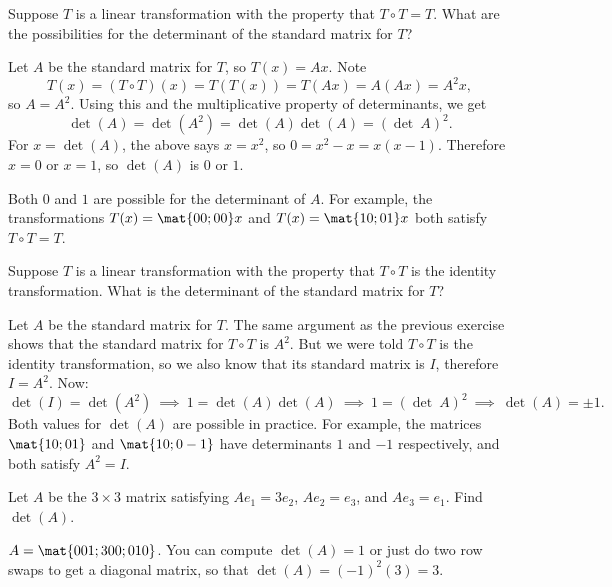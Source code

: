 \begin{problems}
\problem %
Suppose $T$ is a linear transformation with the property that $T \circ T = T$.
What are the possibilities for the determinant of the standard matrix for $T$?

\begin{solution}
Let $A$ be the standard matrix for $T$, so $T(x) = Ax$.  Note
\[T(x) = (T \circ T)(x) = T(T(x)) = T(Ax)=A(Ax) = A^2 x,\] so $A = A^2$.  Using
this and the multiplicative property of determinants, we get
\[\det(A) = \det(A^2) = \det(A) \det(A) = (\det \ A)^2.\]
For $x = \det(A)$, the above says $x = x^2$, so $0 = x^2-x = x(x-1)$.  Therefore
$x=0$ or $x=1$, so $\det(A)$ is $0$ or $1$.

Both $0$ and $1$ are possible for the determinant of $A$.  For example, the
transformations $T(x) = \mat{0 0; 0 0}x$ and $T(x) = \mat{1 0; 0 1}x$ both
satisfy $T \circ T = T$.
\end{solution}


\problem %
Suppose $T$ is a linear transformation with the property that $T \circ T$ is the
identity transformation.  What is the determinant of the standard matrix for
$T$?

\begin{solution}
  Let $A$ be the standard matrix for $T$.  The same argument as the previous
  exercise shows that the standard matrix for $T \circ T$ is $A^2$.  But we were
  told $T \circ T$ is the identity transformation, so we also know that its
  standard matrix is $I$, therefore $I = A^2$.  Now:
  \[\det(I) = \det(A^2) \ \implies \  1 = \det(A)\det(A) \ \implies \  1 = (\det \ A)^2
    \ \implies \ \det(A) = \pm 1.\] %
  Both values for $\det(A)$ are possible in practice.  For example, the matrices
  $\mat{1 0; 0 1}$ and $\mat{1 0; 0 -1}$ have determinants $1$ and $-1$
  respectively, and both satisfy $A^2 = I$.
\end{solution}


\problem %
Let $A$ be the $3 \times 3$ matrix satisfying $Ae_1= 3e_2$, $Ae_2= e_3$, and
$Ae_3=e_1$.  Find $\det(A)$.

\begin{solution}
  $A=\mat{0 0 1; 3 0 0; 0 1 0}$.  You can compute $\det(A)=1$ or just do two row
  swaps to get a diagonal matrix, so that $\det(A)=(-1)^2(3)=3$.
\end{solution}


\end{problems}
